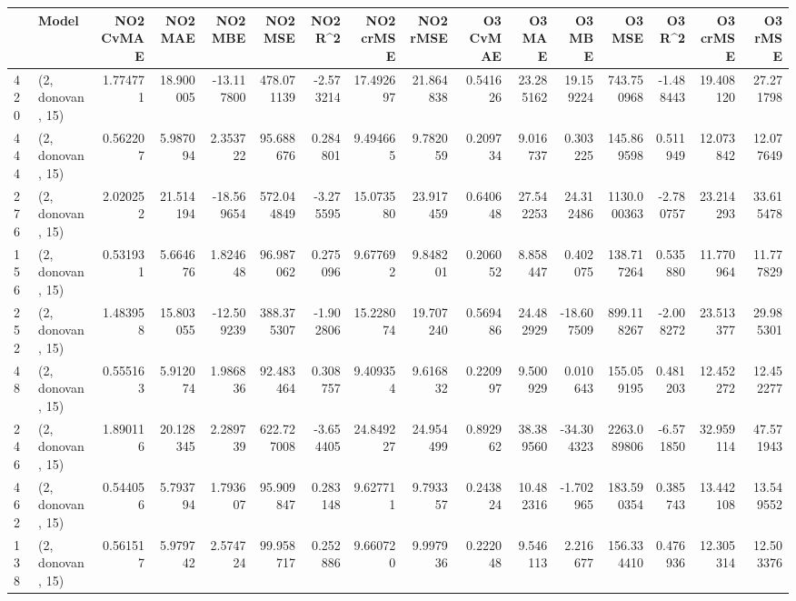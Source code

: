 \begin{tabular}{llrrrrrrrrrrrrrr}
\toprule
{} &             Model &  NO2 CvMAE &    NO2 MAE &    NO2 MBE &      NO2 MSE &    NO2 R\textasciicircum2 &  NO2 crMSE &   NO2 rMSE &  O3 CvMAE &     O3 MAE &     O3 MBE &       O3 MSE &     O3 R\textasciicircum2 &   O3 crMSE &    O3 rMSE \\
\midrule
420 &  (2, donovan, 15) &   1.774771 &  18.900005 & -13.117800 &   478.071139 &  -2.573214 &  17.492697 &  21.864838 &  0.541626 &  23.285162 &  19.159224 &   743.750968 &  -1.488443 &  19.408120 &  27.271798 \\
444 &  (2, donovan, 15) &   0.562207 &   5.987094 &   2.353722 &    95.688676 &   0.284801 &   9.494665 &   9.782059 &  0.209734 &   9.016737 &   0.303225 &   145.869598 &   0.511949 &  12.073842 &  12.077649 \\
276 &  (2, donovan, 15) &   2.020252 &  21.514194 & -18.569654 &   572.044849 &  -3.275595 &  15.073580 &  23.917459 &  0.640648 &  27.542253 &  24.312486 &  1130.000363 &  -2.780757 &  23.214293 &  33.615478 \\
156 &  (2, donovan, 15) &   0.531931 &   5.664676 &   1.824648 &    96.987062 &   0.275096 &   9.677692 &   9.848201 &  0.206052 &   8.858447 &   0.402075 &   138.717264 &   0.535880 &  11.770964 &  11.777829 \\
252 &  (2, donovan, 15) &   1.483958 &  15.803055 & -12.509239 &   388.375307 &  -1.902806 &  15.228074 &  19.707240 &  0.569486 &  24.482929 & -18.607509 &   899.118267 &  -2.008272 &  23.513377 &  29.985301 \\
48  &  (2, donovan, 15) &   0.555163 &   5.912074 &   1.986836 &    92.483464 &   0.308757 &   9.409354 &   9.616832 &  0.220997 &   9.500929 &   0.010643 &   155.059195 &   0.481203 &  12.452272 &  12.452277 \\
246 &  (2, donovan, 15) &   1.890116 &  20.128345 &   2.289739 &   622.727008 &  -3.654405 &  24.849227 &  24.954499 &  0.892962 &  38.389560 & -34.304323 &  2263.089806 &  -6.571850 &  32.959114 &  47.571943 \\
462 &  (2, donovan, 15) &   0.544056 &   5.793794 &   1.793607 &    95.909847 &   0.283148 &   9.627711 &   9.793357 &  0.243824 &  10.482316 &  -1.702965 &   183.590354 &   0.385743 &  13.442108 &  13.549552 \\
138 &  (2, donovan, 15) &   0.561517 &   5.979742 &   2.574724 &    99.958717 &   0.252886 &   9.660720 &   9.997936 &  0.222048 &   9.546113 &   2.216677 &   156.334410 &   0.476936 &  12.305314 &  12.503376 \\

\end{tabular}

